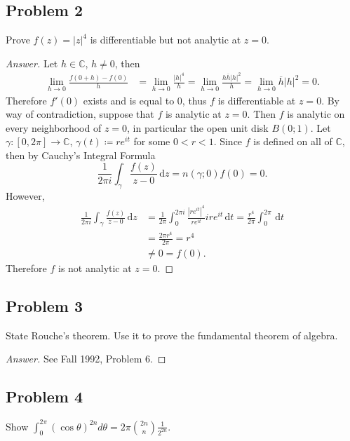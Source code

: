 \documentclass[12pt]{article}
\newcommand{\cx}{\mathbb{C}}
\newcommand\paren[1]{\left( #1 \right)}
\newcommand{\abs}[1]{\left| #1 \right|}
\newcommand{\ds}{\displaystyle}
\theoremstyle{definition}
\begin{document}
\subsection{Problem 2}
Prove $f(z) = |z|^4$ is differentiable but not analytic at $z = 0$.
\begin{proof}[Answer]
    Let $h \in \cx$, $h \neq 0$, then 
    \begin{align*}
        \lim\limits_{h \to 0} \frac{f(0+h) - f(0)}{h} & = \lim\limits_{h \to 0} \frac{|h|^4}{h} = \lim\limits_{h \to 0} \frac{h \overline{h}|h|^2}{h} = \lim\limits_{h \to 0} \overline{h}|h|^2 = 0.
    \end{align*}
    Therefore $f'(0)$ exists and is equal to 0, thus $f$ is differentiable at $z = 0$. By way of contradiction, suppose that $f$ is analytic at $z = 0$. Then $f$ is analytic on every neighborhood of $z = 0$, in particular the open unit disk $B(0;1)$. Let $\gamma : [0,2\pi] \to \cx$, $\gamma(t) \coloneqq re^{it}$ for some $0 < r < 1$. Since $f$ is defined on all of $\cx$, then by Cauchy's Integral Formula
    \[
        \frac{1}{2\pi i} \int_{\gamma} \frac{f(z)}{z-0} \, \mathrm{d}z = n(\gamma;0)f(0) = 0.
    \]
    However,
    \begin{align*}
        \frac{1}{2\pi i} \int_{\gamma} \frac{f(z)}{z-0} \, \mathrm{d}z & = \frac{1}{2\pi} \int_{0}^{2\pi i} \frac{\abs{re^{it}}^4}{re^{it}} i re^{it} \, \mathrm{d}t = \frac{r^4}{2\pi} \int_0^{2\pi} \, \mathrm{d}t \\
        & = \frac{2\pi r^4}{2\pi} = r^4 \\
        & \neq 0 = f(0).
    \end{align*}
    Therefore $f$ is not analytic at $z = 0$.
\end{proof}
\subsection{Problem 3}
State Rouche's theorem. Use it to prove the fundamental theorem of algebra.
\begin{proof}[Answer]
    See Fall 1992, Problem 6.
\end{proof}
\subsection{Problem 4}
Show $\ds \int_0^{2\pi} \paren{ \cos \theta }^{2n} d\theta = 2\pi \binom{2n}{n} \frac{1}{2^{2n}}$.
\end{document}
